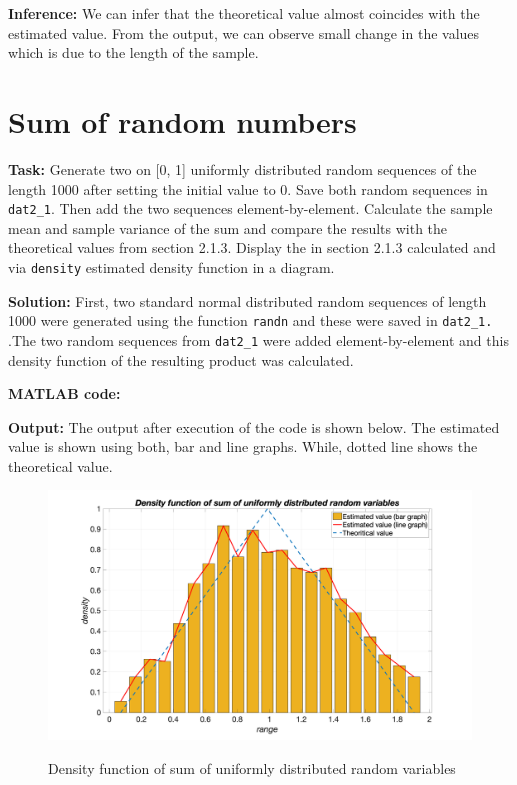 \noindent \textbf{Inference:} We can infer that the theoretical value almost coincides with the estimated value. From the output, we can observe small change in the values which is due to the length of the sample.


\section{ Sum of random numbers  } \label{ Sum of random numbers }
\noindent \textbf{Task:} Generate two on [0, 1] uniformly distributed random sequences of the length 1000 after setting the initial value to 0. Save both random sequences in  \texttt{dat2\_1}.   Then add the two sequences element-by-element. Calculate the sample mean and sample variance of the sum and compare the results with the theoretical values from section 2.1.3. Display the in section 2.1.3 calculated and via \texttt{density} estimated density function in a diagram. 


\noindent \textbf{Solution:} First, two standard normal distributed random sequences of length 1000 were generated using the function \texttt{randn} and these were saved in \texttt{dat2\_1.}  .The two random sequences from \texttt{dat2\_1} were added element-by-element and this density function of the resulting product was calculated.


\noindent \textbf{MATLAB code:}



\noindent \textbf{Output:}
\noindent The output after execution of the code is shown below. The estimated value is shown using both, bar and line graphs. While, dotted line shows the theoretical value.
\begin{figure}[H]
\centering
{\includegraphics[scale=0.16]{ass3_1.png}}
\caption{Density function of sum of uniformly distributed random variables}
\label{Density function of sum of uniformly distributed random variables}
\end{figure}

